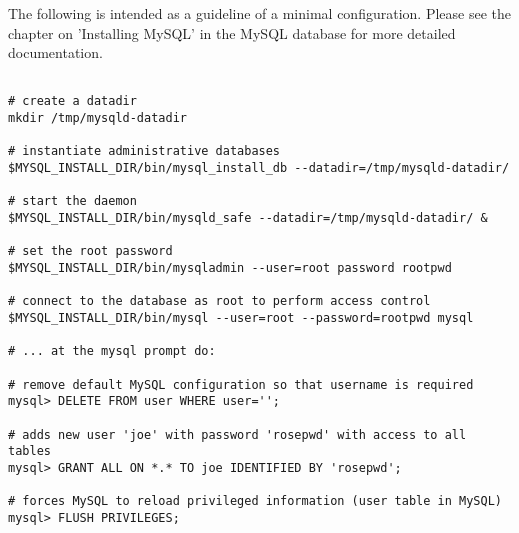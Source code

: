 \documentclass[times, 10pt]{book}
\begin{document}
The following is intended as a guideline of a minimal configuration.  Please
see the chapter on 'Installing MySQL' in the MySQL database for more
detailed documentation.

\begin{verbatim}

# create a datadir
mkdir /tmp/mysqld-datadir

# instantiate administrative databases
$MYSQL_INSTALL_DIR/bin/mysql_install_db --datadir=/tmp/mysqld-datadir/

# start the daemon
$MYSQL_INSTALL_DIR/bin/mysqld_safe --datadir=/tmp/mysqld-datadir/ &

# set the root password
$MYSQL_INSTALL_DIR/bin/mysqladmin --user=root password rootpwd

# connect to the database as root to perform access control
$MYSQL_INSTALL_DIR/bin/mysql --user=root --password=rootpwd mysql

# ... at the mysql prompt do:

# remove default MySQL configuration so that username is required
mysql> DELETE FROM user WHERE user='';

# adds new user 'joe' with password 'rosepwd' with access to all tables
mysql> GRANT ALL ON *.* TO joe IDENTIFIED BY 'rosepwd';

# forces MySQL to reload privileged information (user table in MySQL)
mysql> FLUSH PRIVILEGES;

\end{verbatim}
\end{document}
